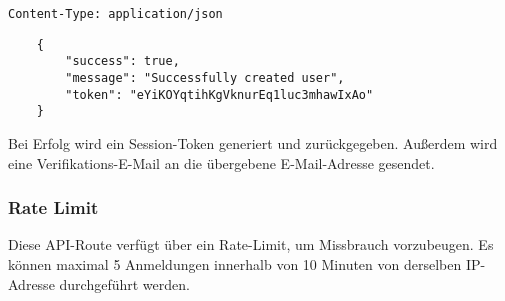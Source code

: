 \lstinline{Content-Type: application/json}
\begin{lstlisting}
    {
        "success": true, 
        "message": "Successfully created user",
        "token": "eYiKOYqtihKgVknurEq1luc3mhawIxAo"
    }
\end{lstlisting}

Bei Erfolg wird ein Session-Token generiert und zurückgegeben. Außerdem wird eine Verifikations-E-Mail an die übergebene E-Mail-Adresse gesendet.

\subsubsection{Rate Limit}

Diese API-Route verfügt über ein Rate-Limit, um Missbrauch vorzubeugen. Es können maximal 5 Anmeldungen innerhalb von 10 Minuten von derselben IP-Adresse durchgeführt werden.